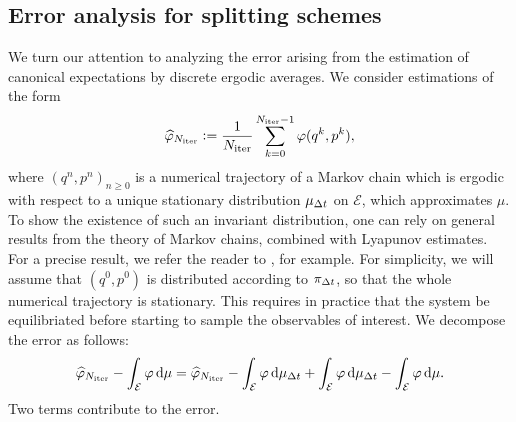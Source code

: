     \subsection{Error analysis for splitting schemes}
        We turn our attention to analyzing the error arising from the estimation of canonical expectations by discrete ergodic averages. We consider estimations of the form 
        \[\widehat{\varphi}_{N_{\mathrm{iter}}} \mathrel{\mathop:}= \frac1{N_{\mathrm{iter}}}\sum_{k=0}^{N_{\mathrm{iter}}-1}\varphi(q^k,p^k),\]
        where $(q^n,p^n)_{n\geq 0}$ is a numerical trajectory of a Markov chain which is ergodic with respect to a unique stationary distribution $\mu_{{\Delta t}}$ on $\mathcal E$, which approximates $\mu$.
        To show the existence of such an invariant distribution, one can rely on general results from the theory of Markov chains, combined with Lyapunov estimates. For a precise result, we refer the reader to \cite[Proposition 2.9]{LMS13}, for example.
        For simplicity, we will assume that $(q^0,p^0)$ is distributed according to $\pi_{\Delta t}$, so that the whole numerical trajectory is stationary. This requires in practice that the system be equilibriated before starting to sample the observables of interest. We decompose the error as follows:
        \begin{equation}\label{eq:error_decomposition}\widehat{\varphi}_{N_{\mathrm{iter}}}-\int_\mathcal{E}\varphi \,\mathrm{d} \mu= \widehat{\varphi}_{N_{\mathrm{iter}}} - \int_\mathcal{E}\varphi \,\mathrm{d} \mu_{{\Delta t}}+\int_\mathcal{E}\varphi\,\mathrm{d} \mu_{{\Delta t}}-\int_{\mathcal E}\varphi \,\mathrm{d} \mu.\end{equation}
        Two terms contribute to the error.

